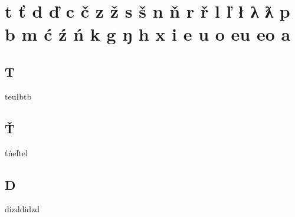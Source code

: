 
\chapter{t ť d ď c č z ž s š n ň r ř l ľ ł \dbl{} λ ƛ p b m ć ź ń k g ŋ h x i e u o eu eo a}

\begin{multicols*}{2}

\section{T}


\begin{description}[leftmargin=*]
    \begin{dictentry}{teułb}{t\lamino\unru\latfrivoic\lamino b}
    \end{dictentry}
\end{description}


\section{Ť}


\begin{description}[leftmargin=*]
    \begin{dictentry}{ťńeľ}{t\apico\pal\egna el\apico}
    \end{dictentry}
\end{description}


\section{D}


\begin{description}[leftmargin=*]
    \begin{dictentry}{dizd}{d\lamino id\tiebar z\lamino d\lamino}
    \end{dictentry}
\end{description}


\end{multicols*}
